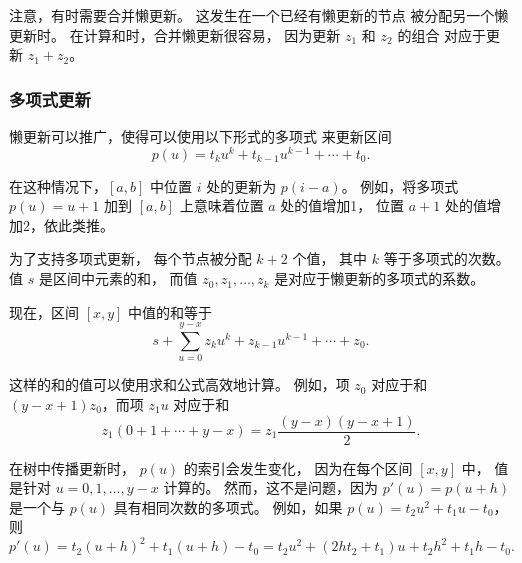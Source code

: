 \begin{center}
\end{center}

注意，有时需要合并懒更新。
这发生在一个已经有懒更新的节点
被分配另一个懒更新时。
在计算和时，合并懒更新很容易，
因为更新 $z_1$ 和 $z_2$ 的组合
对应于更新 $z_1+z_2$。

\subsubsection{多项式更新}

懒更新可以推广，使得可以使用以下形式的多项式
来更新区间
\[p(u) = t_k u^k + t_{k-1} u^{k-1} + \cdots + t_0.\]

在这种情况下，$[a,b]$ 中位置 $i$ 处的更新为 $p(i-a)$。
例如，将多项式 $p(u)=u+1$
加到 $[a,b]$ 上意味着位置 $a$ 处的值增加1，
位置 $a+1$ 处的值增加2，依此类推。

为了支持多项式更新，
每个节点被分配 $k+2$ 个值，
其中 $k$ 等于多项式的次数。
值 $s$ 是区间中元素的和，
而值 $z_0,z_1,\ldots,z_k$ 是对应于懒更新的多项式的系数。

现在，区间 $[x,y]$ 中值的和等于
\[s+\sum_{u=0}^{y-x} z_k u^k + z_{k-1} u^{k-1} + \cdots + z_0.\]

这样的和的值可以使用求和公式高效地计算。
例如，项 $z_0$ 对应于和
$(y-x+1)z_0$，而项 $z_1 u$ 对应于和
\[z_1(0+1+\cdots+y-x) = z_1 \frac{(y-x)(y-x+1)}{2} .\]

在树中传播更新时，
$p(u)$ 的索引会发生变化，
因为在每个区间 $[x,y]$ 中，
值是针对 $u=0,1,\ldots,y-x$ 计算的。
然而，这不是问题，因为
$p'(u)=p(u+h)$ 是一个与 $p(u)$ 具有相同次数的多项式。
例如，如果 $p(u)=t_2 u^2+t_1 u-t_0$，则
\[p'(u)=t_2(u+h)^2+t_1(u+h)-t_0=t_2 u^2 + (2ht_2+t_1)u+t_2h^2+t_1h-t_0.\]


